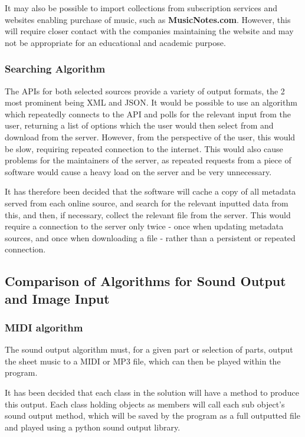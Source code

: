 It may also be possible to import collections from subscription services and websites enabling purchase of music, such as \textbf{MusicNotes.com}. However, this will require closer contact with the companies maintaining the website and may not be appropriate for an educational and academic purpose.

\subsubsection{Searching Algorithm}
The APIs for both selected sources provide a variety of output formats, the 2 most prominent being XML and JSON. 
It would be possible to use an algorithm which repeatedly connects to the API and polls for the relevant input from the user, returning a list of options which the user would then select from and download from the server. However, from the perspective of the user, this would be slow, requiring repeated connection to the internet. This would also cause problems for the maintainers of the server, as repeated requests from a piece of software would cause a heavy load on the server and be very unnecessary.

It has therefore been decided that the software will cache a copy of all metadata served from each online source, and search for the relevant inputted data from this, and then, if necessary, collect the relevant file from the server. This would require a connection to the server only twice - once when updating metadata sources, and once when downloading a file - rather than a persistent or repeated connection.

\subsection{Comparison of Algorithms for Sound Output and Image Input}
\subsubsection{MIDI algorithm}
The sound output algorithm must, for a given part or selection of parts, output the sheet music to a MIDI or MP3 file, which can then be played within the program. 

It has been decided that each class in the solution will have a method to produce this output. Each class holding objects as members will call each sub object's sound output method, which will be saved by the program as a full outputted file and played using a python sound output library.

